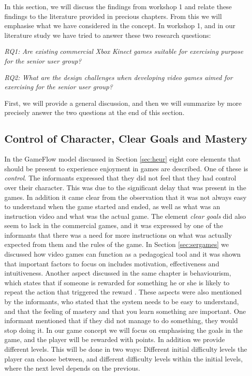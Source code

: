 In this section, we will discuss the findings from workshop 1 and relate these findings to the literature provided in precious chapters. From this we will emphasise what we have considered in the concept. In workshop 1, and in our literature study we have tried to answer these two research questions: 

\emph{RQ1: Are existing commercial Xbox Kinect games suitable for exercising purpose for the senior user group?}

\emph{RQ2: What are the design challenges when developing video games aimed for exercising for the senior user group?}

First, we will provide a general discussion, and then we will summarize by more precisely answer the two questions at the end of this section. 

\subsection{Control of Character, Clear Goals and Mastery}
In the GameFlow model \cite{sweetser} discussed in Section \ref{sec:heur} eight core elements that should be present to experience enjoyment in games are described. One of these is \emph{control}. The informants expressed that they did not feel that they had control over their character. This was due to the significant delay that was present in the games. In addition it came clear from the observation that it was not always easy to understand when the game started and ended, as well as what was an instruction video and what was the actual game. The element \emph{clear goals} did also seem to lack in the commercial games, and it was expressed by one of the informants that there was a need for more instructions on what was actually expected from them and the rules of the game. In Section \ref{sec:sergames} we discussed how video games can function as a pedagogical tool and it was shown that important factors to focus on includes motivation, effectiveness and intuitiveness. Another aspect discussed in the same chapter is behaviourism, which states that if someone is rewarded for something he or she is likely to repeat the action that triggered the reward \cite{understandingvg}. These aspects were also mentioned by the informants, who stated that the system needs to be easy to understand, and that the feeling of mastery and that you learn something are important.  One informant mentioned that if they did not manage to do something, they would stop doing it. In our game concept we will focus on emphasising the goals in the game, and the player will be rewarded with points. In addition we provide different levels. This will be done in two ways: Different initial difficulty levels the player can choose between, and different difficulty levels within the initial levels, where the next level depends on the previous.  

